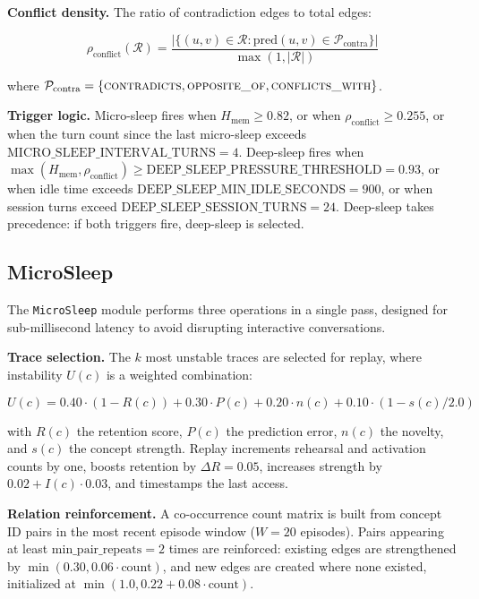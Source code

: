 \documentclass[11pt,twocolumn]{article}
\begin{document}
\textbf{Conflict density.} The ratio of contradiction edges to total edges:

\begin{equation}
\rho_{\text{conflict}}(\mathcal{R}) = \frac{|\{(u,v) \in \mathcal{R} : \text{pred}(u,v) \in \mathcal{P}_{\text{contra}}\}|}{\max(1, |\mathcal{R}|)}
\label{eq:conflict}
\end{equation}

where $\mathcal{P}_{\text{contra}} = \{\text{\scshape contradicts}, \text{\scshape opposite\_of}, \text{\scshape conflicts\_with}\}$.

\textbf{Trigger logic.} Micro-sleep fires when $H_{\text{mem}} \geq 0.82$, or when $\rho_{\text{conflict}} \geq 0.255$, or when the turn count since the last micro-sleep exceeds $\text{MICRO\_SLEEP\_INTERVAL\_TURNS} = 4$. Deep-sleep fires when $\max(H_{\text{mem}}, \rho_{\text{conflict}}) \geq \text{DEEP\_SLEEP\_PRESSURE\_THRESHOLD} = 0.93$, or when idle time exceeds $\text{DEEP\_SLEEP\_MIN\_IDLE\_SECONDS} = 900$, or when session turns exceed $\text{DEEP\_SLEEP\_SESSION\_TURNS} = 24$. Deep-sleep takes precedence: if both triggers fire, deep-sleep is selected.

\subsection{MicroSleep}

The \texttt{MicroSleep} module performs three operations in a single pass, designed for sub-millisecond latency to avoid disrupting interactive conversations.

\textbf{Trace selection.} The $k$ most unstable traces are selected for replay, where instability $U(c)$ is a weighted combination:

\begin{equation}
U(c) = 0.40 \cdot (1 - R(c)) + 0.30 \cdot P(c) + 0.20 \cdot n(c) + 0.10 \cdot (1 - s(c)/2.0)
\label{eq:instability}
\end{equation}

with $R(c)$ the retention score, $P(c)$ the prediction error, $n(c)$ the novelty, and $s(c)$ the concept strength. Replay increments rehearsal and activation counts by one, boosts retention by $\Delta R = 0.05$, increases strength by $0.02 + I(c) \cdot 0.03$, and timestamps the last access.

\textbf{Relation reinforcement.} A co-occurrence count matrix is built from concept ID pairs in the most recent episode window ($W = 20$ episodes). Pairs appearing at least $\text{min\_pair\_repeats} = 2$ times are reinforced: existing edges are strengthened by $\min(0.30, 0.06 \cdot \text{count})$, and new edges are created where none existed, initialized at $\min(1.0, 0.22 + 0.08 \cdot \text{count})$.
\end{document}
